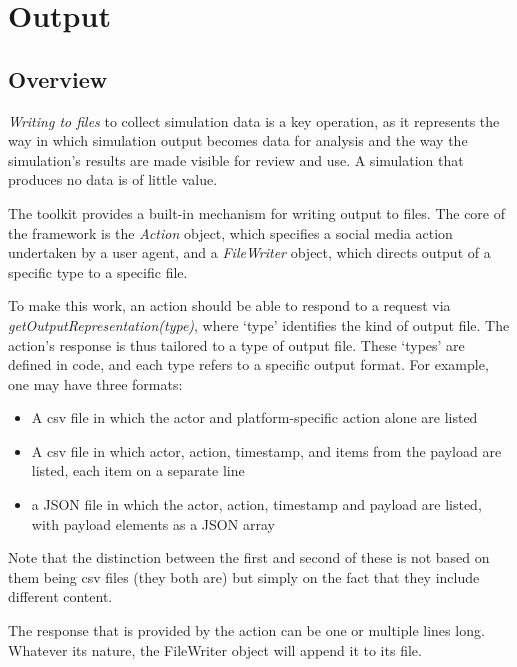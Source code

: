 
\chapter{Output} \label{chap:Output}

\section{Overview}
\textit{Writing to files} to collect simulation data is a key operation, as it represents the way in which simulation output becomes data for analysis and the way the simulation's results are made visible for review and use. A simulation that produces no data is of little value.

\par The \rhpc toolkit provides a built-in mechanism for writing output to files. The core of the framework is the \textit{Action} object, which specifies a social media action undertaken by a user agent, and a \textit{FileWriter} object, which directs output of a specific type to a specific file.

\par To make this work, an action should be able to respond to a request via \textit{getOutputRepresentation(type)}, where `type' identifies the kind of output file. The action's response is thus tailored to a type of output file. These `types' are defined in code, and each type refers to a specific output format. For example, one may have three formats:

\begin{itemize}
  \item A csv file in which the actor and platform-specific action alone are listed
  \item A csv file in which actor, action, timestamp, and items from the payload are listed, each item on a separate line
  \item a JSON file in which the actor, action, timestamp and payload are listed, with payload elements as a JSON array
\end{itemize}

Note that the distinction between the first and second of these is not based on them being csv files (they both are) but simply on the fact that they include different content.

The response that is provided by the action can be one or multiple lines long. Whatever its nature, the FileWriter object will append it to its file.

